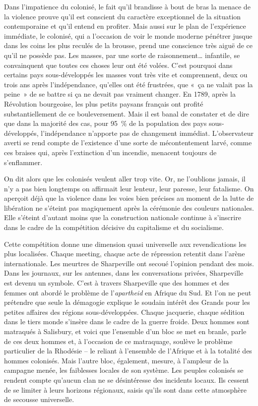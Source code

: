 \documentclass[french,twoside]{book} %
\begin{document}
\noindent Dans l’impatience du colonisé, le fait qu’il brandisse à bout de bras la menace de la violence prouve qu’il est conscient du caractère exceptionnel de la situation contemporaine et qu’il entend en profiter. Mais aussi sur le plan de l’expérience immédiate, le colonisé, qui a l’occasion de voir le monde moderne pénétrer jusque dans les coins les plus reculés de la brousse, prend une conscience très aiguë de ce qu’il ne possède pas. Les masses, par une sorte de raisonnement… infantile, se convainquent que toutes ces choses leur ont été volées. C’est pourquoi dans certains pays sous-développés les masses vont très vite et comprennent, deux ou trois ans après l’indépendance, qu’elles ont été frustrées, que « ça ne valait pas la peine » de se battre si ça ne devait pas vraiment changer. En 1789, après la Révolution bourgeoise, les plus petits paysans français ont profité substantiellement de ce bouleversement. Mais il est banal de constater et de dire que dans la majorité des cas, pour 95 \% de la population des pays sous-développés, l’indépendance n’apporte pas de changement immédiat. L’observateur averti se rend compte de l’existence d’une sorte de mécontentement larvé, comme ces braises qui, après l’extinction d’un incendie, menacent toujours de s’enflammer.\par
On dit alors que les colonisés veulent aller trop vite. Or, ne l’oublions jamais, il n’y a pas bien longtemps on affirmait leur lenteur, leur paresse, leur fatalisme. On aperçoit déjà que la violence dans les voies bien précises au moment de la lutte de libération ne s’éteint pas magiquement après la cérémonie des couleurs nationales. Elle s’éteint d’autant moins que la construction nationale continue à s’inscrire dans le cadre de la compétition décisive du capitalisme et du socialisme.\par
 Cette compétition donne une dimension quasi universelle aux revendications les plus localisées. Chaque meeting, chaque acte de répression retentit dans l’arène internationale. Les meurtres de Sharpeville ont secoué l’opinion pendant des mois. Dans les journaux, sur les antennes, dans les conversations privées, Sharpeville est devenu un symbole. C’est à travers Sharpeville que des hommes et des femmes ont abordé le problème de l’\emph{apartheid} en Afrique du Sud. Et l’on ne peut prétendre que seule la démagogie explique le soudain intérêt des Grands pour les petites affaires des régions sous-développées. Chaque jacquerie, chaque sédition dans le tiers monde s’insère dans le cadre de la guerre froide. Deux hommes sont matraqués à Salisbury, et voici que l’ensemble d’un bloc se met en branle, parle de ces deux hommes et, à l’occasion de ce matraquage, soulève le problème particulier de la Rhodésie – le reliant à l’ensemble de l’Afrique et à la totalité des hommes colonisés. Mais l’autre bloc, également, mesure, à l’ampleur de la campagne menée, les faiblesses locales de son système. Les peuples colonisés se rendent compte qu’aucun clan ne se désintéresse des incidents locaux. Ils cessent de se limiter à leurs horizons régionaux, saisis qu’ils sont dans cette atmosphère de secousse universelle.\par
\end{document}
